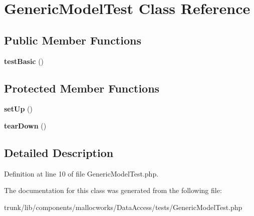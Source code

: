 \hypertarget{class_generic_model_test}{
\section{GenericModelTest Class Reference}
\label{class_generic_model_test}
}
\subsection*{Public Member Functions}
\begin{DoxyCompactItemize}
\item 
\hypertarget{class_generic_model_test_a43130cb481135ee931f1562a1503378a}{
{\bfseries testBasic} ()}
\label{class_generic_model_test_a43130cb481135ee931f1562a1503378a}

\end{DoxyCompactItemize}
\subsection*{Protected Member Functions}
\begin{DoxyCompactItemize}
\item 
\hypertarget{class_generic_model_test_a0bc688732d2b3b162ffebaf7812e78da}{
{\bfseries setUp} ()}
\label{class_generic_model_test_a0bc688732d2b3b162ffebaf7812e78da}

\item 
\hypertarget{class_generic_model_test_a80fe3d17e658907fc75346a0ec9d6fc7}{
{\bfseries tearDown} ()}
\label{class_generic_model_test_a80fe3d17e658907fc75346a0ec9d6fc7}

\end{DoxyCompactItemize}


\subsection{Detailed Description}


Definition at line 10 of file GenericModelTest.php.



The documentation for this class was generated from the following file:\begin{DoxyCompactItemize}
\item 
trunk/lib/components/mallocworks/DataAccess/tests/GenericModelTest.php\end{DoxyCompactItemize}
